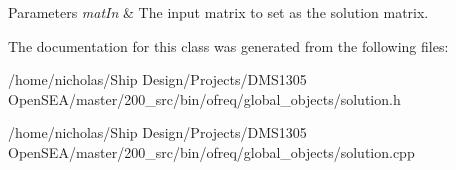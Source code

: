 \begin{DoxyParams}{Parameters}
{\em mat\-In} & The input matrix to set as the solution matrix. \\
\hline
\end{DoxyParams}


The documentation for this class was generated from the following files\-:\begin{DoxyCompactItemize}
\item 
/home/nicholas/\-Ship Design/\-Projects/\-D\-M\-S1305 Open\-S\-E\-A/master/200\-\_\-src/bin/ofreq/global\-\_\-objects/solution.\-h\item 
/home/nicholas/\-Ship Design/\-Projects/\-D\-M\-S1305 Open\-S\-E\-A/master/200\-\_\-src/bin/ofreq/global\-\_\-objects/solution.\-cpp\end{DoxyCompactItemize}
